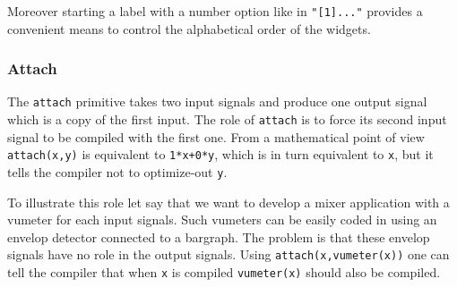 Moreover starting a label with a number option like in \lstinline'"[1]..."' provides
a convenient means to control the alphabetical order of the widgets.

\subsubsection{Attach}
The \lstinline'attach' primitive takes two input signals and produce one output signal which is a copy of the first input. The role of \lstinline'attach' is to force its second input signal to be compiled with the first one. From a mathematical point of view \lstinline'attach(x,y)' is equivalent to \lstinline'1*x+0*y', which is in turn equivalent to \lstinline'x', but it tells the compiler not to optimize-out \lstinline'y'.

To illustrate this role let say that we want to develop a mixer application with a vumeter for each input signals. Such vumeters can be easily coded in \faust using an envelop detector connected to a bargraph. The problem is that these envelop signals have no role in the output signals. Using \lstinline'attach(x,vumeter(x))' one can tell the compiler that when \lstinline'x' is compiled \lstinline'vumeter(x)' should also be compiled.
